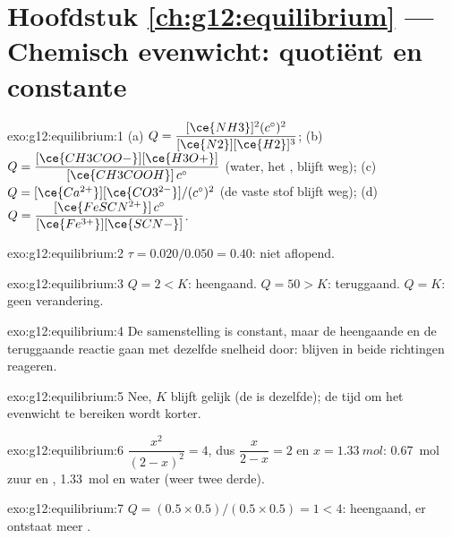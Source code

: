 \section*{Hoofdstuk \ref{ch:g12:equilibrium} --- Chemisch evenwicht: quotiënt en constante}

\begin{solution}{exo:g12:equilibrium:1}
(a) $Q = \dfrac{[\ce{NH3}]^2 (c^\circ)^2}{[\ce{N2}][\ce{H2}]^3}$;
(b) $Q = \dfrac{[\ce{CH3COO-}][\ce{H3O+}]}{[\ce{CH3COOH}]\,c^\circ}$ (water,
het , blijft weg);
(c) $Q = [\ce{Ca^{2+}}][\ce{CO3^{2-}}]/(c^\circ)^2$ (de vaste stof blijft
weg);
(d) $Q = \dfrac{[\ce{FeSCN^{2+}}]\,c^\circ}{[\ce{Fe^{3+}}][\ce{SCN-}]}$.
\end{solution}

\begin{solution}{exo:g12:equilibrium:2}
$\tau = 0.020/0.050 = 0.40$: niet aflopend.
\end{solution}

\begin{solution}{exo:g12:equilibrium:3}
$Q = 2 < K$: heengaand. $Q = 50 > K$: teruggaand. $Q = K$: geen
verandering.
\end{solution}

\begin{solution}{exo:g12:equilibrium:4}
De samenstelling is constant, maar de heengaande en de teruggaande
reactie gaan met dezelfde snelheid door:  blijven in beide
richtingen reageren.
\end{solution}

\begin{solution}{exo:g12:equilibrium:5}
Nee, $K$ blijft gelijk (de  is dezelfde); de tijd om het
evenwicht te bereiken wordt korter.
\end{solution}

\begin{solution}{exo:g12:equilibrium:6}
$\dfrac{x^2}{(2-x)^2} = 4$, dus $\dfrac{x}{2-x} = 2$ en
$x = \qty{1.33}{mol}$: \qty{0.67}{mol} zuur en ,
\qty{1.33}{mol}  en water (weer twee derde).
\end{solution}

\begin{solution}{exo:g12:equilibrium:7}
$Q = (0.5 \times 0.5)/(0.5 \times 0.5) = 1 < 4$: heengaand, er ontstaat
meer .
\end{solution}

